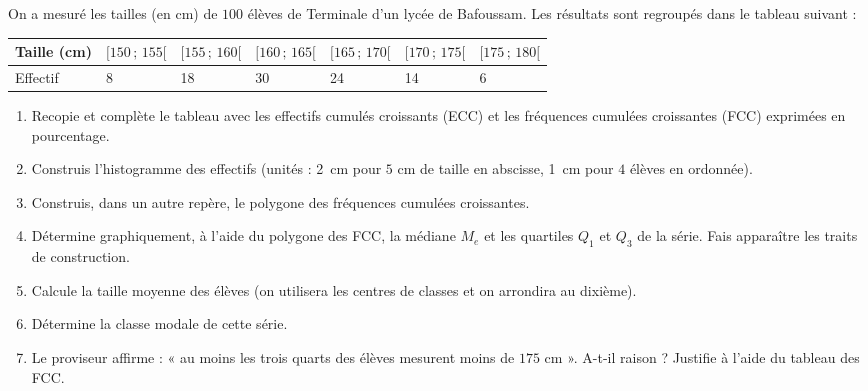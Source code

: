 \documentclass[11pt]{article}
\newcommand{\legende}[1]{\par\vspace{6pt}{\popsemi\fontsize{9}{11.5}\selectfont\color{popmuted}#1}}
\begin{document}
\begin{exercice}
On a mesuré les tailles (en cm) de $100$ élèves de Terminale d'un lycée de Bafoussam. Les résultats sont regroupés dans le tableau suivant :
\begin{center}
\begin{tabularx}{\linewidth}{|l|X|X|X|X|X|X|}
\hline
\rowcolor{popblueL}
Taille (cm) & $[150\,;\,155[$ & $[155\,;\,160[$ & $[160\,;\,165[$ & $[165\,;\,170[$ & $[170\,;\,175[$ & $[175\,;\,180[$ \\
\hline
Effectif & 8 & 18 & 30 & 24 & 14 & 6 \\
\hline
\end{tabularx}
\end{center}
\begin{enumerate}
    \item Recopie et complète le tableau avec les effectifs cumulés croissants (ECC) et les fréquences cumulées croissantes (FCC) exprimées en pourcentage.
    \item Construis l'histogramme des effectifs (unités : \SI{2}{cm} pour $5$ cm de taille en abscisse, \SI{1}{cm} pour $4$ élèves en ordonnée).
    \item Construis, dans un autre repère, le polygone des fréquences cumulées croissantes.
    \item Détermine graphiquement, à l'aide du polygone des FCC, la médiane $M_e$ et les quartiles $Q_1$ et $Q_3$ de la série. Fais apparaître les traits de construction.
    \item Calcule la taille moyenne des élèves (on utilisera les centres de classes et on arrondira au dixième).
    \item Détermine la classe modale de cette série.
    \item Le proviseur affirme : « au moins les trois quarts des élèves mesurent moins de $175$ cm ». A-t-il raison ? Justifie à l'aide du tableau des FCC.
\end{enumerate}
\end{exercice}

\begin{popfigure}
\legende{Histogramme des tailles.}
\end{popfigure}
\end{document}
